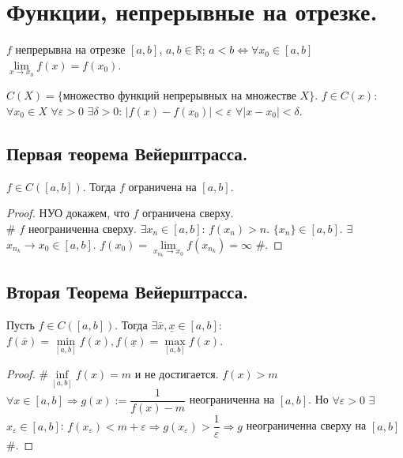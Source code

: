 \documentclass[12pt]{article}
\begin{document}
	\section{Функции, непрерывные на отрезке.}
	\begin{definition}
		$f$ непрерывна на отрезке $[a, b]$, $a, b \in \mathbb{R}$; $a < b \Leftrightarrow \forall x_0 \in [a, b]$ $\lim\limits_{x \rightarrow x_0} f(x) = f(x_0)$.
	\end{definition}
	\begin{note}
		$C(X) = \{ \text{множество функций непрерывных на множестве } X \}$. $f \in C(x)$: $\forall x_0 \in X$ $\forall \varepsilon > 0$ $\exists \delta > 0$: $|f(x) - f(x_0)| < \varepsilon$ $\forall |x - x_0| < \delta$.
	\end{note}
	\subsection{Первая теорема Вейерштрасса.}
	\begin{theorem}
		$f \in C([a, b])$. Тогда $f$ ограничена на $[a, b]$.
	\end{theorem}
	\begin{proof}
		НУО докажем, что $f$ ограничена сверху. \\
		$\#$ $f$ неограниченна сверху.	$\exists x_n \in [a, b]$: $f(x_n) > n$.	$\{ x_n \} \in [a, b]$. $\exists$ $x_{n_k} \rightarrow x_0 \in [a, b]$. $f(x_0) = \lim\limits_{x_{n_k} \rightarrow x_0} f(x_{n_k}) = \infty$ $\#$.
	\end{proof}
	\subsection{Вторая Теорема Вейерштрасса.}
	\begin{theorem}
		Пусть $f \in C([a, b])$. Тогда $\exists \overline{x}, \underline{x} \in [a, b]$: $f(\overline{x}) = \min\limits_{[a, b]} f(x), f(\underline{x}) = \max\limits_{[a, b]} f(x)$.
	\end{theorem}
	\begin{proof}
		$\# \inf\limits_{[a, b]} f(x) = m$ и не достигается. $f(x) > m$ $\forall x \in [a, b] \Rightarrow g(x) := \dfrac{1}{f(x) - m}$ неограниченна на $[a, b]$. Но $\forall \varepsilon > 0$ $\exists$ $x_{\varepsilon} \in [a, b]$: $f(x_{\varepsilon}) < m + \varepsilon \Rightarrow g(x_{\varepsilon}) > \dfrac{1}{\varepsilon} \Rightarrow g$ неограниченна сверху на $[a, b]$ $\#$.
	\end{proof}
\end{document}
